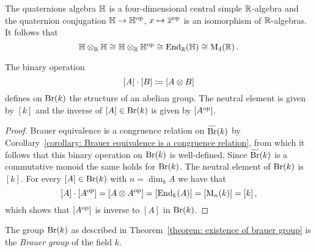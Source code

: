 \begin{example}
  The quaternions algebra $\mathbb{H}$ is a four-dimensional central simple $\mathbb{R}$-algebra and the quaternion conjugation $\mathbb{H} \to \mathbb{H}^{\operatorname{op}}$, $x \mapsto \overline{x}^{\operatorname{op}}$ is an isomorphism of $\mathbb{R}$-algebras.
  It follows that
  \[
          \mathbb{H} \mathbin{\otimes}_{\mathbb{R}} \mathbb{H}
    \cong \mathbb{H} \mathbin{\otimes}_{\mathbb{R}} \mathbb{H}^{\operatorname{op}}
    \cong \operatorname{End}_{\mathbb{R}}(\mathbb{H})
    \cong \operatorname{M}_4(\mathbb{R}) \,.
  \]
\end{example}


\begin{theorem}
  \label{theorem: existence of brauer group}
  The binary operation
  \[
              [A] \cdot [B]
    \coloneqq  [A \mathbin{\otimes} B]
  \]
  defines on $\operatorname{Br}(k)$ the structure of an abelian group.
  The neutral element is given by $[k]$ and the inverse of $[A] \in \operatorname{Br}(k)$ is given by $[A^{\operatorname{op}}]$.
\end{theorem}


\begin{proof}
  Brauer equivalence is a congruence relation on $\widetilde{\operatorname{Br}}(k)$ by Corollary~\ref{corollary: Brauer equivalence is a congruence relation}, from which it follows that this binary operation on $\operatorname{Br}(k)$ is well-defined.
  Since $\widetilde{\operatorname{Br}}(k)$ is a commutative monoid the same holds for $\operatorname{Br}(k)$.
  The neutral element of $\operatorname{Br}(k)$ is $[k]$.
  For every $[A] \in \operatorname{Br}(k)$ with $n = \dim_k A$ we have that
  \[
      [A] \cdot [A^{\operatorname{op}}]
    = [A \mathbin{\otimes} A^{\operatorname{op}}]
    = [\operatorname{End}_k(A)]
    = [\operatorname{M}_n(k)]
    = [k] \,,
  \]
  which shows that $[A^{\operatorname{op}}]$ is inverse to $[A]$ in $\operatorname{Br}(k)$.
\end{proof}


\begin{definition}
  The group $\operatorname{Br}(k)$ as described in Theorem~\ref{theorem: existence of brauer group} is the \emph{Brauer group} of the field $k$.
\end{definition}


